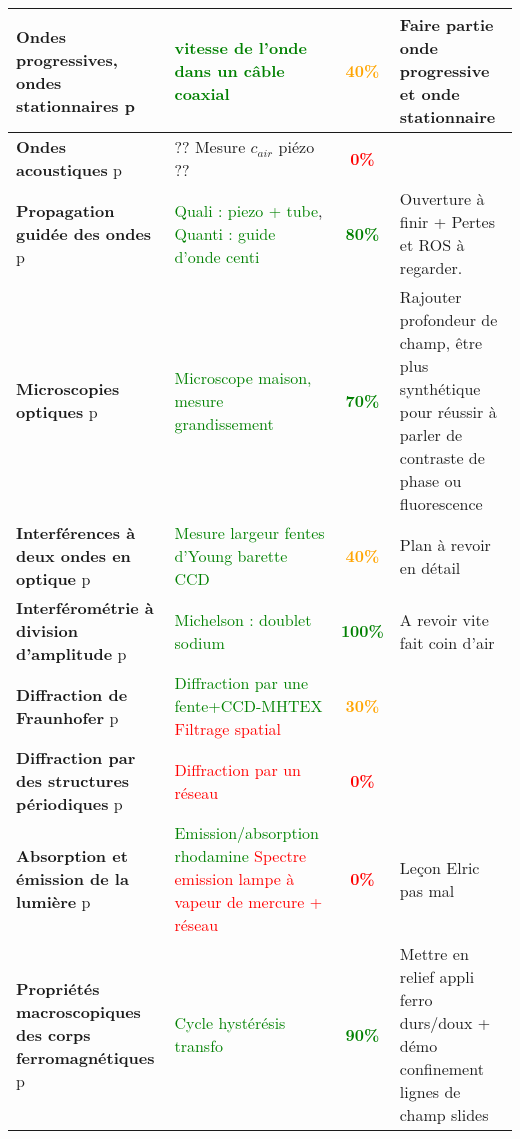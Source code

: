 \begin{changemargin}{-1.5cm}{-0cm}
\begin{center}
\begin{tabularx}{\paperwidth-2cm}{| X | X | c | X |}
\hline
  \textbf{Ondes progressives, ondes stationnaires} p\pageref{LP_OndesProgressives}~& \textcolor{green}{vitesse de l'onde dans un câble coaxial} & \textcolor{orange}{\textbf{40\%}} & Faire partie onde progressive et onde stationnaire \\
  \hline
  \textbf{Ondes acoustiques} p\pageref{LP_OndeAcoustique}~& ?? Mesure $c_{air}$ piézo ?? & \textcolor{red}{\textbf{0\%}} &  \\
  \hline
  \textbf{Propagation guidée des ondes} p\pageref{LP_PropagationGuidee} & \textcolor{green}{Quali : piezo + tube}, \textcolor{green}{Quanti : guide d'onde centi}& \textcolor{green}{\textbf{80\%}} & Ouverture à finir + Pertes et ROS à regarder. \\
  \hline
  \textbf{Microscopies optiques} p\pageref{LP_Microscopie}~& \textcolor{green}{Microscope maison, mesure grandissement}~& \textcolor{green}{\textbf{70\%}} & Rajouter profondeur de champ, être plus synthétique pour réussir à parler de contraste de phase ou fluorescence \\
  \hline
  \textbf{Interférences à deux ondes en optique} p\pageref{LP_InterferencesDeuxOndes}~& \textcolor{green}{Mesure largeur fentes d'Young barette CCD} & \textcolor{orange}{\textbf{40\%}} & Plan à revoir en détail\\
  \hline
  \textbf{Interférométrie à division d'amplitude} p\pageref{LP_DivisionAmplitude} & \textcolor{green}{Michelson : doublet sodium} & \textcolor{green}{\textbf{100\%}} & A revoir vite fait coin d'air \\
  \hline
  \textbf{Diffraction de Fraunhofer} p\pageref{LP_DiffractionFraunhofer} & \textcolor{green}{Diffraction par une fente+CCD-MHTEX} \textcolor{red}{Filtrage spatial} & \textcolor{orange}{\textbf{30\%}} &  \\
  \hline
  \textbf{Diffraction par des structures périodiques} p\pageref{LP_DiffractionPeriodique} & \textcolor{red}{Diffraction par un réseau} & \textcolor{red}{\textbf{0\%}} &  \\
  \hline
  \textbf{Absorption et émission de la lumière} p\pageref{LP_Absorption} & \textcolor{green}{Emission/absorption rhodamine} \textcolor{red}{Spectre emission lampe à vapeur de mercure + réseau} & \textcolor{red}{\textbf{0\%}} & Leçon Elric pas mal \\
  \hline
  \hline
  \textbf{Propriétés macroscopiques des corps ferromagnétiques } p\pageref{LP_Ferromagnetisme} & \textcolor{green}{Cycle hystérésis transfo} & \textcolor{green}{\textbf{90\%}} & Mettre en relief appli ferro durs/doux + démo confinement lignes de champ slides \\

\end{tabularx}
\end{center}
\end{changemargin}
